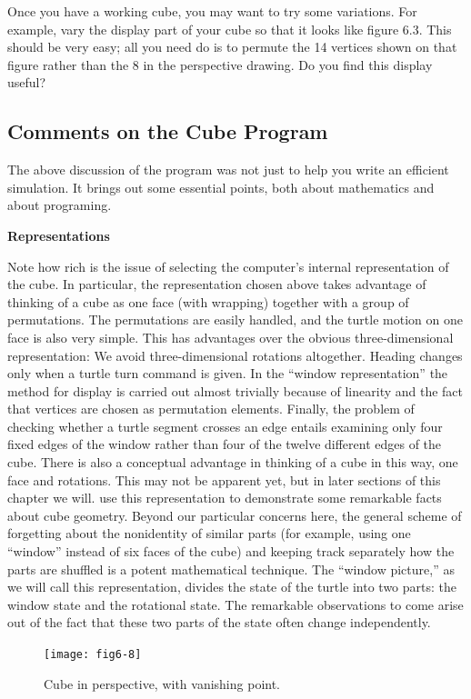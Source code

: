 \documentclass{book}
\begin{document}
Once you have a working cube, you may want to try some variations.
For example, vary the display part of your cube so that it looks like
figure 6.3. This should be very easy; all you need do is to permute the
14 vertices shown on that figure rather than the 8 in the perspective
drawing. Do you find this display useful?

\subsection{Comments on the Cube Program}

The above discussion of the program was not just to help you write
an efficient simulation. It brings out some essential points, both about
mathematics and about programing.

\textbf{Representations}

Note how rich is the issue of selecting the computer's internal representation of the cube. In particular, the representation chosen above
takes advantage of thinking of a cube as one face (with wrapping)
together with a group of permutations. The permutations are easily
handled, and the turtle motion on one face is also very simple. This has
advantages over the obvious three-dimensional representation: We avoid
three-dimensional rotations altogether. Heading changes only when a
turtle turn command is given. In the ``window representation'' the
method for display is carried out almost trivially because of linearity
and the fact that vertices are chosen as permutation elements. Finally,
the problem of checking whether a turtle segment crosses an edge entails
examining only four fixed edges of the window rather than four of the
twelve different edges of the cube. There is also a conceptual advantage
in thinking of a cube in this way, one face and rotations. This may
not be apparent yet, but in later sections of this chapter we will. use
this representation to demonstrate some remarkable facts about cube
geometry. Beyond our particular concerns here, the general scheme of
forgetting about the nonidentity of similar parts (for example, using one
``window'' instead of six faces of the cube) and keeping track separately
how the parts are shuffled is a potent mathematical technique. The
``window picture,'' as we will call this representation, divides the state
of the turtle into two parts: the window state and the rotational state.
The remarkable observations to come arise out of the fact that these two
parts of the state often change independently.

\begin{figure}
\begin{center}
\texttt{[image: fig6-8]}
\caption{Cube in perspective, with vanishing point.}
\end{center}
\end{figure}
\end{document}
